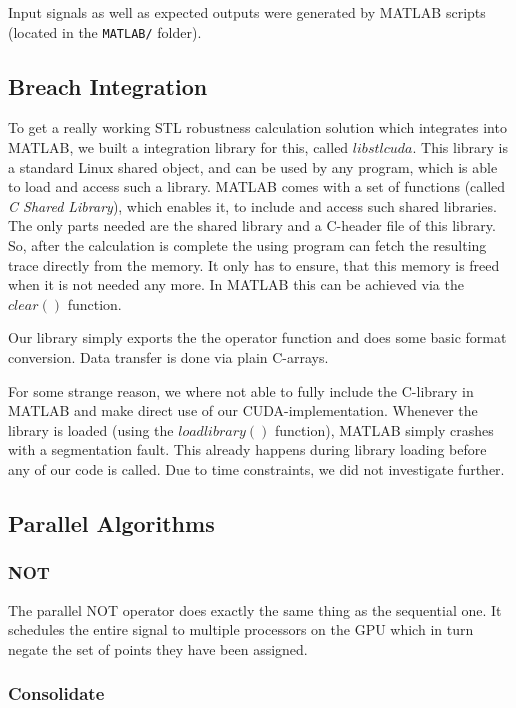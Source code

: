 \documentclass[a4paper,10pt]{article}
\begin{document}
Input signals as well as expected outputs were generated by MATLAB scripts (located
in the \verb|MATLAB/| folder).

\subsection{Breach Integration}

To get a really working STL robustness calculation solution which integrates into MATLAB, we built a integration library for this, called $libstlcuda$. 
This library is a standard Linux shared object, and can be used by any program, which is able to load and access such a library. 
MATLAB comes with a set of functions (called {\it C Shared Library}), which enables it, to include and access such shared libraries. 
The only parts needed are the shared library and a C-header file of this library. So, after the calculation is complete the using 
program can fetch the resulting trace directly from the memory. It only has to ensure, that this memory is freed when it is not needed any more. 
In MATLAB this can be achieved via the $clear()$ function.

Our library simply exports the the operator function and does some basic format conversion. Data transfer is done via plain C-arrays.

For some strange reason, we where not able to fully include the C-library in MATLAB and make direct use of our
CUDA-implementation. Whenever the library is loaded (using the $loadlibrary()$ function), MATLAB simply crashes with a segmentation fault. 
This already happens during library loading before any of our code is called. Due to time constraints, we did not investigate further.

\subsection{Parallel Algorithms}

\subsubsection{NOT}

The parallel NOT operator does exactly the same thing as the sequential one. It
schedules the entire signal to multiple processors on the GPU which in turn negate
the set of points they have been assigned.

\subsubsection{Consolidate}
\label{sec:consolidate}
\end{document}
